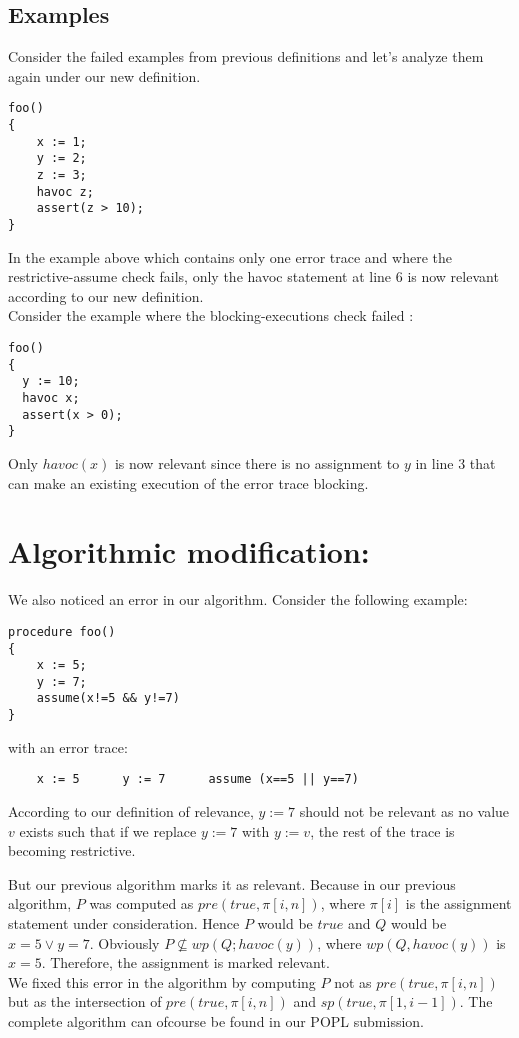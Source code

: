 \documentclass{article}
\begin{document}
\subsection{Examples}
Consider the failed examples from previous definitions and let's analyze them again under our new definition.
\begin{lstlisting}
foo()
{
	x := 1;
	y := 2;
	z := 3;
	havoc z;
	assert(z > 10);
}
\end{lstlisting}
In the example above which contains only one error trace and where the restrictive-assume check fails, only the havoc statement at line 6 is now relevant according to our new definition. \\
Consider the example where the blocking-executions check failed :
\begin{lstlisting}
foo()
{
  y := 10;
  havoc x;
  assert(x > 0);
}
\end{lstlisting}
Only $havoc(x)$ is now relevant since there is no assignment to $y$ in line 3 that can make an existing execution of the error trace blocking.

\section{Algorithmic modification:}
We also noticed an error in our algorithm. Consider the following example:
\begin{lstlisting}
procedure foo()
{
	x := 5;
	y := 7;
	assume(x!=5 && y!=7)
}
\end{lstlisting}
with an error trace:
\begin{lstlisting}
	x := 5		y := 7		assume (x==5 || y==7) 
\end{lstlisting}
According to our definition of relevance, $y:=7$ should not be relevant as no value $v$ exists such that if we replace $y:=7$ with $y:=v$, the rest of the trace is becoming restrictive. 

But our previous algorithm marks it as relevant. Because in our previous algorithm, $P$ was computed as $pre(true, \pi[i,n])$, where $\pi[i]$ is the assignment statement under consideration. Hence $P$ would be $true$ and $Q$ would be $x=5 \vee y=7$. Obviously $P \not \subseteq wp(Q; havoc(y))$, where $wp(Q, havoc(y))$ is $x=5$. Therefore, the assignment is marked relevant. \\
We fixed this error in the algorithm by computing $P$ not as $pre(true, \pi[i,n])$ but as the intersection of $pre(true, \pi[i,n])$ and $sp(true, \pi[1,i-1])$. The complete algorithm can ofcourse be found in our POPL submission. \\
\end{document}
